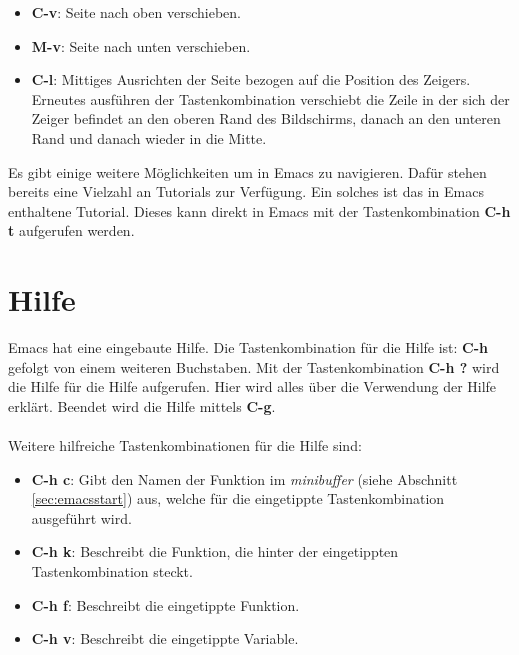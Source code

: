 \begin{itemize}
\item \textbf{C-v}: Seite nach oben {\glqq}verschieben{\grqq}.
\item \textbf{M-v}: Seite nach unten {\glqq}verschieben{\grqq}.
\item \textbf{C-l}: Mittiges Ausrichten der Seite bezogen auf die
  Position des Zeigers. Erneutes ausführen der Tastenkombination
  verschiebt die Zeile in der sich der Zeiger befindet an den oberen
  Rand des Bildschirms, danach an den unteren Rand und danach wieder
  in die Mitte.\\
\end{itemize}
Es gibt einige weitere Möglichkeiten um in Emacs zu navigieren. Dafür
stehen bereits eine Vielzahl an Tutorials zur Verfügung. Ein solches
ist das in Emacs enthaltene Tutorial. Dieses kann direkt in Emacs mit
der Tastenkombination \textbf{C-h t} aufgerufen
werden. \cite{CameronRosenblattRaymond1996}\\

\section{Hilfe}
Emacs hat eine eingebaute Hilfe. Die Tastenkombination für die Hilfe
ist: \textbf{C-h} gefolgt von einem weiteren Buchstaben. Mit der
Tastenkombination \textbf{C-h ?} wird die Hilfe für die Hilfe
aufgerufen. Hier wird alles über die Verwendung der Hilfe
erklärt. Beendet wird die Hilfe mittels
\textbf{C-g}. \cite{CameronRosenblattRaymond1996}\\\\ Weitere
hilfreiche Tastenkombinationen für die Hilfe sind:
\begin{itemize}
\item \textbf{C-h c}: Gibt den Namen der Funktion im
  \textit{minibuffer} (siehe Abschnitt \ref{sec:emacsstart}) aus,
  welche für die eingetippte Tastenkombination ausgeführt wird.
\item \textbf{C-h k}: Beschreibt die Funktion, die hinter der
  eingetippten Tastenkombination steckt.
\item \textbf{C-h f}: Beschreibt die eingetippte Funktion.
\item \textbf{C-h v}: Beschreibt die eingetippte Variable.\\
\end{itemize}

